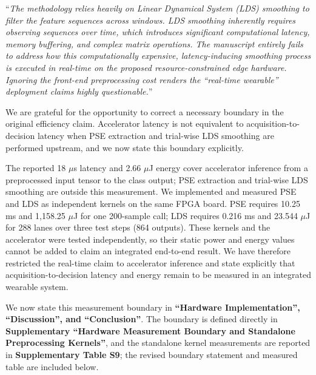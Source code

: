\documentclass[12pt,technote,onecolumn]{IEEEtran}
\begin{document}
\vspace{4mm}

``{\it The methodology relies heavily on Linear Dynamical System (LDS)
smoothing to filter the feature sequences across windows. LDS smoothing
inherently requires observing sequences over time, which introduces
significant computational latency, memory buffering, and complex matrix
operations. The manuscript entirely fails to address how this
computationally expensive, latency-inducing smoothing process is
executed in real-time on the proposed resource-constrained edge
hardware. Ignoring the front-end preprocessing cost renders the
``real-time wearable'' deployment claims highly questionable.}''
\vspace{1mm}


We are grateful for the opportunity to correct a necessary boundary in the original efficiency claim. Accelerator latency is not equivalent to acquisition-to-decision latency when PSE extraction and trial-wise LDS smoothing are performed upstream, and we now state this boundary explicitly.

The reported 18 $\mu$s latency and 2.66 $\mu$J energy cover accelerator
inference from a preprocessed input tensor to the class output; PSE
extraction and trial-wise LDS smoothing are outside this measurement. We
implemented and measured PSE and LDS as independent kernels on the same
FPGA board. PSE requires 10.25 ms and 1,158.25 $\mu$J for one
200-sample call; LDS requires 0.216 ms and 23.544 $\mu$J for 288 lanes
over three test steps (864 outputs). These kernels and the accelerator
were tested independently, so their static power and energy values
cannot be added to claim an integrated end-to-end result. We have
therefore restricted the real-time claim to accelerator inference and
state explicitly that acquisition-to-decision latency and energy remain
to be measured in an integrated wearable system.



We now state this measurement boundary in \textbf{``Hardware Implementation'', ``Discussion'', and ``Conclusion''}. The boundary is defined directly in \textbf{Supplementary ``Hardware Measurement Boundary and Standalone Preprocessing Kernels''}, and the standalone kernel measurements are reported in \textbf{Supplementary Table S9}; the revised boundary statement and measured table are included below.
\end{document}
